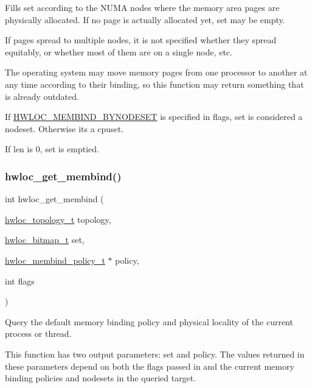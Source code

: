 Fills {\ttfamily set} according to the N\+U\+MA nodes where the memory area pages are physically allocated. If no page is actually allocated yet, {\ttfamily set} may be empty.

If pages spread to multiple nodes, it is not specified whether they spread equitably, or whether most of them are on a single node, etc.

The operating system may move memory pages from one processor to another at any time according to their binding, so this function may return something that is already outdated.

If \hyperlink{a00191_ggab00475fd98815bf4fb9aaf752030e7d2a71f19fe4505f1c083dc8e6f7bdea6256}{H\+W\+L\+O\+C\+\_\+\+M\+E\+M\+B\+I\+N\+D\+\_\+\+B\+Y\+N\+O\+D\+E\+S\+ET} is specified in {\ttfamily flags}, set is considered a nodeset. Otherwise it\textquotesingle{}s a cpuset.

If {\ttfamily len} is 0, {\ttfamily set} is emptied. \mbox{\label{a00191_gae21f0a1a884929c784bebf070252aa56}} 
\subsubsection{\texorpdfstring{hwloc\+\_\+get\+\_\+membind()}{hwloc\_get\_membind()}}
{\footnotesize\ttfamily int hwloc\+\_\+get\+\_\+membind (\begin{DoxyParamCaption}\item[{\hyperlink{a00186_ga9d1e76ee15a7dee158b786c30b6a6e38}{hwloc\+\_\+topology\+\_\+t}}]{topology,  }\item[{\hyperlink{a00205_gaa3c2bf4c776d603dcebbb61b0c923d84}{hwloc\+\_\+bitmap\+\_\+t}}]{set,  }\item[{\hyperlink{a00191_gac9764f79505775d06407b40f5e4661e8}{hwloc\+\_\+membind\+\_\+policy\+\_\+t} $\ast$}]{policy,  }\item[{int}]{flags }\end{DoxyParamCaption})}



Query the default memory binding policy and physical locality of the current process or thread. 

This function has two output parameters\+: {\ttfamily set} and {\ttfamily policy}. The values returned in these parameters depend on both the {\ttfamily flags} passed in and the current memory binding policies and nodesets in the queried target.

